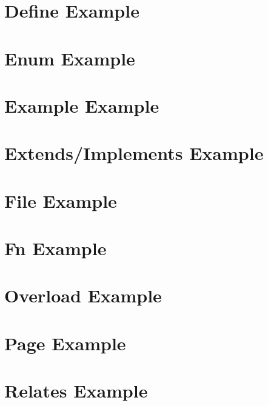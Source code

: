 \documentclass{book}
\newcommand{\+}{\discretionary{\mbox{\scriptsize$\hookleftarrow$}}{}{}}
\begin{document}
\chapter{Define Example}\label{define_example}\hypertarget{define_example}{}
\chapter{Enum Example}\label{enum_example}\hypertarget{enum_example}{}
\chapter{Example Example}\label{example_example}\hypertarget{example_example}{}
\chapter{Extends/Implements Example}\label{extends_example}\hypertarget{extends_example}{}
\chapter{File Example}\label{file_example}\hypertarget{file_example}{}
\chapter{Fn Example}\label{fn_example}\hypertarget{fn_example}{}
\chapter{Overload Example}\label{overload_example}\hypertarget{overload_example}{}
\chapter{Page Example}\label{page_example}\hypertarget{page_example}{}
\chapter{Relates Example}\label{relates_example}\hypertarget{relates_example}{}
\end{document}
